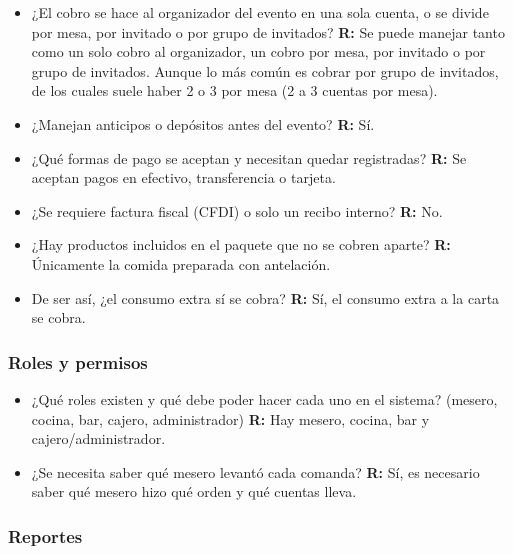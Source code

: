 \begin{itemize}
    \item ¿El cobro se hace al organizador del evento en una sola cuenta, o se divide por mesa, por invitado o por grupo de invitados?
    \subitem \textbf{R:} Se puede manejar tanto como un solo cobro al organizador, un cobro por mesa, por invitado o por grupo de invitados. Aunque lo más común es cobrar por grupo de invitados, de los cuales suele haber 2 o 3 por mesa (2 a 3 cuentas por mesa).

    \item ¿Manejan anticipos o depósitos antes del evento?
    \subitem \textbf{R:} Sí.

    \item ¿Qué formas de pago se aceptan y necesitan quedar registradas?
    \subitem \textbf{R:} Se aceptan pagos en efectivo, transferencia o tarjeta.

    \item ¿Se requiere factura fiscal (CFDI) o solo un recibo interno?
    \subitem \textbf{R:} No.

    \item ¿Hay productos incluidos en el paquete que no se cobren aparte?
    \subitem \textbf{R:} Únicamente la comida preparada con antelación.

    \item De ser así, ¿el consumo extra sí se cobra?
    \subitem \textbf{R:} Sí, el consumo extra a la carta se cobra.
\end{itemize}

\subsubsection{Roles y permisos}

\begin{itemize}
    \item ¿Qué roles existen y qué debe poder hacer cada uno en el sistema? (mesero, cocina, bar, cajero, administrador)
    \subitem \textbf{R:} Hay mesero, cocina, bar y cajero/administrador.

    \item ¿Se necesita saber qué mesero levantó cada comanda?
    \subitem \textbf{R:} Sí, es necesario saber qué mesero hizo qué orden y qué cuentas lleva.
\end{itemize}

\subsubsection{Reportes}

